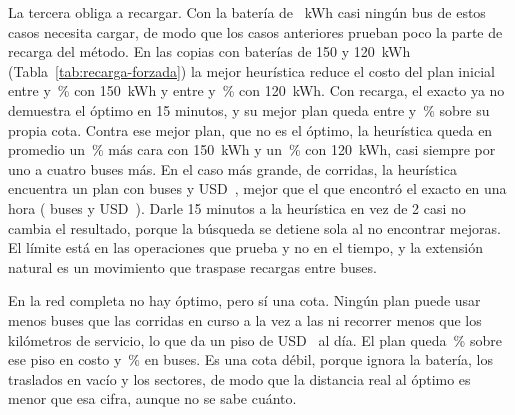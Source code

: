 La tercera obliga a recargar. Con la batería de \Bateria~kWh casi ningún bus de estos casos necesita cargar, de modo que los casos anteriores prueban poco la parte de recarga del método. En las copias con baterías de 150 y 120~kWh (Tabla~\ref{tab:recarga-forzada}) la mejor heurística reduce el costo del plan inicial entre \MejoraRecargaMinCientoCincuenta{} y \MejoraRecargaMaxCientoCincuenta\,\% con 150~kWh y entre \MejoraRecargaMinCientoVeinte{} y \MejoraRecargaMaxCientoVeinte\,\% con 120~kWh. Con recarga, el exacto ya no demuestra el óptimo en 15 minutos, y su mejor plan queda entre \BrechaCotaRecargaMinCientoCincuenta{} y \BrechaCotaRecargaMaxCientoCincuenta\,\% sobre su propia cota. Contra ese mejor plan, que no es el óptimo, la heurística queda en promedio un \DifMediaRecargaCientoCincuentaAbs\,\% más cara con 150~kWh y un \DifMediaRecargaCientoVeinteAbs\,\% con 120~kWh, casi siempre por uno a cuatro buses más. En el caso más grande, de \CorridasGrande{} corridas, la heurística encuentra un plan con \BusesHeurGrande{} buses y USD~\CostoHeurGrande, mejor que el que encontró el exacto en una hora (\BusesExactaGrande{} buses y USD~\CostoExactaGrande). Darle 15 minutos a la heurística en vez de 2 casi no cambia el resultado, porque la búsqueda se detiene sola al no encontrar mejoras. El límite está en las operaciones que prueba y no en el tiempo, y la extensión natural es un movimiento que traspase recargas entre buses.

\begin{table}[htbp]
\centering
\caption{Recarga forzada. Mejor plan del exacto en 15 minutos (una hora en 10 rutas) y mejor heurística con 2 o 15 minutos.}
\label{tab:recarga-forzada}
\footnotesize
{}
\end{table}

En la red completa no hay óptimo, pero sí una cota. Ningún plan puede usar menos buses que las \SimultaneidadLaboral{} corridas en curso a la vez a las \HoraSimultaneidadLaboral{} ni recorrer menos que los kilómetros de servicio, lo que da un piso de USD~\CotaCosto{} al día. El plan queda \BrechaCotaCosto\,\% sobre ese piso en costo y \BrechaCotaBuses\,\% en buses. Es una cota débil, porque ignora la batería, los traslados en vacío y los sectores, de modo que la distancia real al óptimo es menor que esa cifra, aunque no se sabe cuánto.

